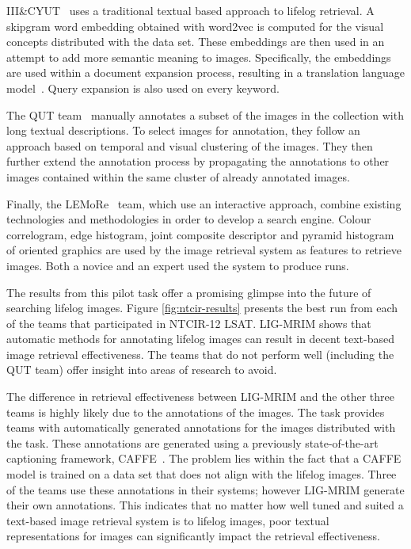 III\&CYUT~\cite{lin2016image} uses a traditional textual based approach to lifelog retrieval. A skipgram word embedding obtained with word2vec\cite{mikolov2013word2vec} is computed for the visual concepts distributed with the data set. These embeddings are then used in an attempt to add more semantic meaning to images. Specifically, the embeddings are used within a document expansion process, resulting in a translation language model~\cite{zuccon2015integrating}. Query expansion is also used on every keyword.

The QUT team~\cite{scells2016qut} manually annotates a subset of the images in the collection with long textual descriptions. To select images for annotation, they follow an approach based on temporal and visual clustering of the images. They then further extend the annotation process by propagating the annotations to other images contained within the same cluster of already annotated images.

Finally, the LEMoRe~\cite{de40lemore} team, which use an interactive approach, combine existing technologies and methodologies in order to develop a search engine. Colour correlogram, edge histogram, joint composite descriptor and pyramid histogram of oriented graphics are used by the image retrieval system as features to retrieve images. Both a novice and an expert used the system to produce runs.

The results from this pilot task offer a promising glimpse into the future of searching lifelog images. Figure \ref{fig:ntcir-results} presents the best run from each of the teams that participated in NTCIR-12 LSAT. LIG-MRIM shows that automatic methods for annotating lifelog images can result in decent text-based image retrieval effectiveness. The teams that do not perform well (including the QUT team) offer insight into areas of research to avoid. 

The difference in retrieval effectiveness between LIG-MRIM and the other three teams is highly likely due to the annotations of the images. The task provides teams with automatically generated annotations for the images distributed with the task. These annotations are generated using a previously state-of-the-art captioning framework, CAFFE~\cite{jia2014caffe}. The problem lies within the fact that a CAFFE model is trained on a data set that does not align with the lifelog images. Three of the teams use these annotations in their systems; however LIG-MRIM generate their own annotations. This indicates that no matter how well tuned and suited a text-based image retrieval system is to lifelog images, poor textual representations for images can significantly impact the retrieval effectiveness.

